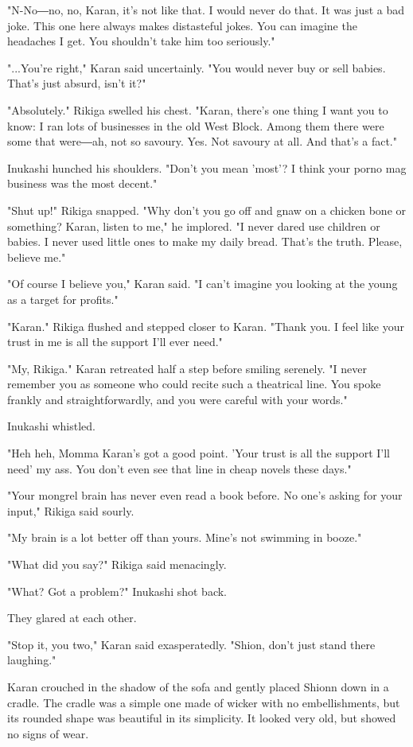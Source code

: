 "N-No―no, no, Karan, it's not like that. I would never do that. It was
just a bad joke. This one here always makes distasteful jokes. You can
imagine the headaches I get. You shouldn't take him too seriously."

"...You're right," Karan said uncertainly. "You would never buy or sell
babies. That's just absurd, isn't it?"

"Absolutely." Rikiga swelled his chest. "Karan, there's one thing I want
you to know: I ran lots of businesses in the old West Block. Among them
there were some that were―ah, not so savoury. Yes. Not savoury at all.
And that's a fact."

Inukashi hunched his shoulders. "Don't you mean 'most'? I think your
porno mag business was the most decent."

"Shut up!" Rikiga snapped. "Why don't you go off and gnaw on a chicken
bone or something? Karan, listen to me," he implored. "I never dared use
children or babies. I never used little ones to make my daily bread.
That's the truth. Please, believe me."

"Of course I believe you," Karan said. "I can't imagine you looking at
the young as a target for profits."

"Karan." Rikiga flushed and stepped closer to Karan. "Thank you. I feel
like your trust in me is all the support I'll ever need."

"My, Rikiga." Karan retreated half a step before smiling serenely. "I
never remember you as someone who could recite such a theatrical line.
You spoke frankly and straightforwardly, and you were careful with your
words."

Inukashi whistled.

"Heh heh, Momma Karan's got a good point. 'Your trust is all the support
I'll need' my ass. You don't even see that line in cheap novels these
days."

"Your mongrel brain has never even read a book before. No one's asking
for your input," Rikiga said sourly.

"My brain is a lot better off than yours. Mine's not swimming in booze."

"What did you say?" Rikiga said menacingly.

"What? Got a problem?" Inukashi shot back.

They glared at each other.

"Stop it, you two," Karan said exasperatedly. "Shion, don't just stand
there laughing."

Karan crouched in the shadow of the sofa and gently placed Shionn down
in a cradle. The cradle was a simple one made of wicker with no
embellishments, but its rounded shape was beautiful in its simplicity.
It looked very old, but showed no signs of wear.

